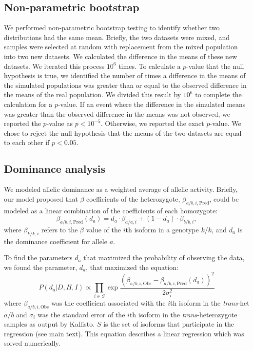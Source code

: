 \documentclass[10pt, twocolumn]{article}
\begin{document}
\subsection*{Non-parametric bootstrap}
We performed non-parametric bootstrap testing to identify whether two
distributions had the same mean. Briefly, the two datasets were mixed, and
samples were selected at random with replacement from the mixed population into
two new datasets. We calculated the difference in the means of these new
datasets. We iterated this process $10^6$ times. To calculate a $p$-value that
the null hypothesis is true, we identified the number of times a difference in
the means of the simulated populations was greater than or equal to the observed
difference in the means of the real population. We divided this result by $10^6$
to complete the calculation for a $p$-value. If an event where the difference in
the simulated means was greater than the observed difference in the means was
not observed, we reported the $p$-value as $p<10^{-5}$. Otherwise, we reported
the exact $p$-value. We chose to reject the null hypothesis that the means of
the two datasets are equal to each other if $p < 0.05$.

\subsection*{Dominance analysis}
\label{subsec:dominance}
We modeled allelic dominance as a weighted average of allelic activity. Briefly,
our model proposed that $\beta$ coefficients of the heterozygote,
$\beta_{a/b,i,\text{Pred}}$, could be modeled as a linear combination of the
coefficients of each homozygote:
\begin{equation}
  \beta_{a/b,i,\text{Pred}}(d_a) = d_a\cdot \beta_{a/a,i} + (1-d_a)\cdot \beta_{b/b,i},
\end{equation}
where $\beta_{k/k, i}$ refers to the $\beta$ value of the $i$th isoform in a
genotype $k/k$, and $d_a$ is the dominance coefficient for allele $a$.

To find the parameters $d_a$ that maximized the probability of observing the
data, we found the parameter, $d_a$, that maximized the equation:
\begin{equation}
    P(d_a|D,H,I) \propto \prod_{i \in S}
                   \exp{\frac{{(\beta_{a/b,i,\text{Obs}} -
                                \beta_{a/b,i,\text{Pred}}(d_a))}^2}{
                                2\sigma_i^2}}
\end{equation}
where $\beta_{a/b,i,\text{Obs}}$ was the coefficient associated with the $i$th
isoform in the \emph{trans}-het $a/b$ and $\sigma_i$ was the standard error of
the $i$th isoform in the \emph{trans}-heterozygote samples as output by
Kallisto. $S$ is the set of isoforms that participate in the regression (see
main text). This equation describes a linear regression which was solved
numerically.
\end{document}

